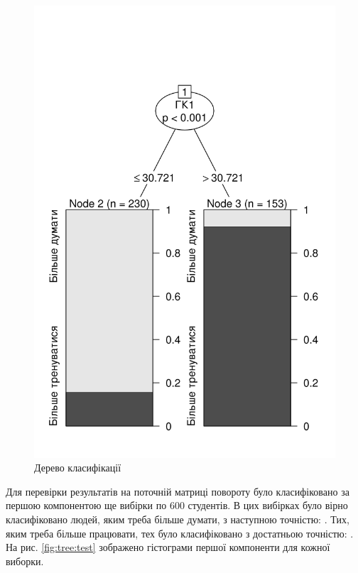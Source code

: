 \begin{figure}[h]
  \centering
    \includegraphics{images/tree}
  \caption{Дерево класифікації}
  \label{fig:tree:simple}
\end{figure}

Для перевірки результатів на поточній матриці повороту було класифіковано
за першою компонентою ще вибірки по $600$ студентів.
В цих вибірках було вірно класифіковано людей, яким треба більше думати,
з наступною точністю: \testThinkersPredictionQuality.
Тих, яким треба більше працювати, тех було класифіковано з достатньою
точністю: \testLearnersPredictionQuality.
На рис. \ref{fig:tree:test} зображено гістограми першої компоненти
для кожної виборки.

